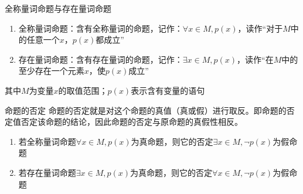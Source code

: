 \begin{definition}{全称量词命题与存在量词命题}{}
\begin{enumerate}
\item 全称量词命题：含有全称量词的命题，记作：$\forall x \in M, p(x)$，读作“对于$M$中的任意一个$x$，$p(x)$都成立”
\item 存在量词命题：含有存在量词的命题，记作：$\exists x \in M, p(x)$，读作“在$M$中的至少存在一个元素$x$，使$p(x)$成立”
\end{enumerate}
其中$M$为变量$x$的取值范围；$p(x)$表示含有变量的语句
\end{definition}

\begin{definition}{命题的否定}
命题的否定就是对这个命题的真值（真或假）进行取反。即命题的否定值否定该命题的结论，因此命题的否定与原命题的真假性相反。
\end{definition}

\begin{remark}
	\begin{enumerate}
		\item 若全称量词命题$\forall x \in M, p(x)$为真命题，则它的否定$\exists x \in M, \neg p(x)$为假命题
		\item 若存在量词命题$\exists x \in M, p(x)$为真命题，则它的否定$\forall x \in M, \neg p(x)$为假命题
	\end{enumerate}
\end{remark}



